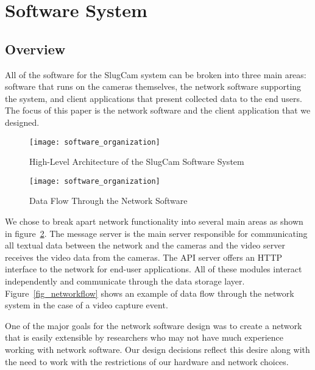 \section{Software System}
\subsection{Overview}

All of the software for the SlugCam system can be broken into three main areas:
software that runs on the cameras themselves, the network software supporting
the system, and client applications that present collected data to the end
users. The focus of this paper is the network software and the client
application that we designed.

\begin{figure}[!t]
\centering
\texttt{[image: software\_organization]}
\caption{High-Level Architecture of the SlugCam Software System}
\label{fig_netoverview}
\end{figure}

\begin{figure}[!t]
\centering
\texttt{[image: software\_organization]}
\caption{Data Flow Through the Network Software}
\label{fig_netoverview}
\end{figure}

We chose to break apart network functionality into several main areas as shown
in figure~\ref{fig_netoverview}. The message server is the main server
responsible for communicating all textual data between the network and the
cameras and the video server receives the video data from the cameras. The API
server offers an HTTP interface to the network for end-user applications. All of
these modules interact independently and communicate through the data storage
layer. Figure~\ref{fig_networkflow} shows an example of data flow through the
network system in the case of a video capture event.


One of the major goals for the network software design was to create a
network that is easily extensible by researchers who may not have much
experience working with network software. Our design decisions reflect this
desire along with the need to work with the restrictions of our hardware and
network choices.


